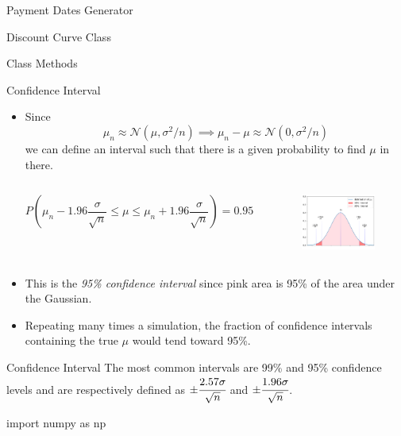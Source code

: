 \documentclass{beamer}
\begin{document}
\begin{frame}[fragile]{Payment Dates Generator}
\begin{itemize}
\begin{frame}{Discount Curve Class}
\begin{frame}{Class Methods}
\begin{itemize}
\begin{iptyhon}
\begin{frame}{Confidence Interval}
\begin{itemize}
\item Since
\begin{equation*}
\mu_n \approx \mathcal{N}(\mu, \sigma^2/n)\implies \mu_n - \mu \approx \mathcal{N}(0, \sigma^2/n)
\end{equation*}
we can define an interval such that there is a given probability to find $\mu$ in there.
\begin{columns}
\begin{equation*}
P\left(\mu_n - 1.96\frac{\sigma}{\sqrt{n}}\le \mu \le \mu_n + 1.96\frac{\sigma}{\sqrt{n}}\right) = 0.95
\end{equation*}
\begin{figure}[h]
    \begin{center}
    \includegraphics[width=0.8\linewidth]{confidence_interval_pink}
    \end{center}
\end{figure}    
\end{columns}
\item This is the \emph{95\% confidence interval} since pink area is 95\% of the area under the Gaussian.
\item Repeating many times a simulation, the fraction of confidence intervals containing the true $\mu$ would tend toward 95\%.
\end{itemize}
\end{frame}

\begin{frame}[fragile]{Confidence Interval}
The most common intervals are 99\% and 95\% confidence levels and are respectively defined as $\pm \cfrac{2.57\sigma}{\sqrt{n}}$ and $\pm \cfrac{1.96\sigma}{\sqrt{n}}$. 
\begin{ipython}
import numpy as np


\end{ipython}
\end{frame}
\end{iptyhon}
\end{itemize}
\end{frame}
\end{frame}
\end{itemize}
\end{frame}
\end{document}

